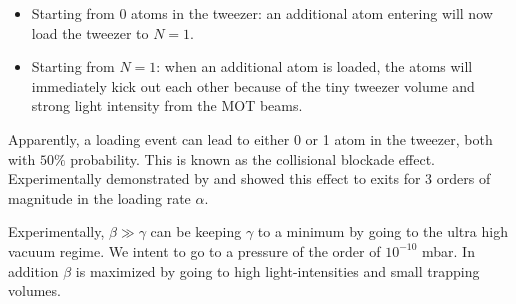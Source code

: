 \begin{itemize}
	\item Starting from 0 atoms in the tweezer: an additional atom entering will now load the tweezer to $N=1$. 
	
	\item Starting from $N=1$: when an additional atom is loaded, the atoms will immediately kick out each other because of the tiny tweezer volume and strong light intensity from the MOT beams. 
\end{itemize}

Apparently, a loading event can lead to either 0 or 1 atom in the tweezer, both with $50\%$ probability. This is known as the collisional blockade effect. Experimentally demonstrated by \cite{Schlosser2001} and \cite{Schlosser2002} showed this effect to exits for 3 orders of magnitude in the loading rate $\alpha$.

Experimentally, $\beta \gg \gamma$ can be keeping $\gamma$ to a minimum by going to the ultra high vacuum regime. We intent to go to a pressure of the order of $10^{-10}$ mbar. In addition $\beta$ is maximized by going to high light-intensities and small trapping volumes. 